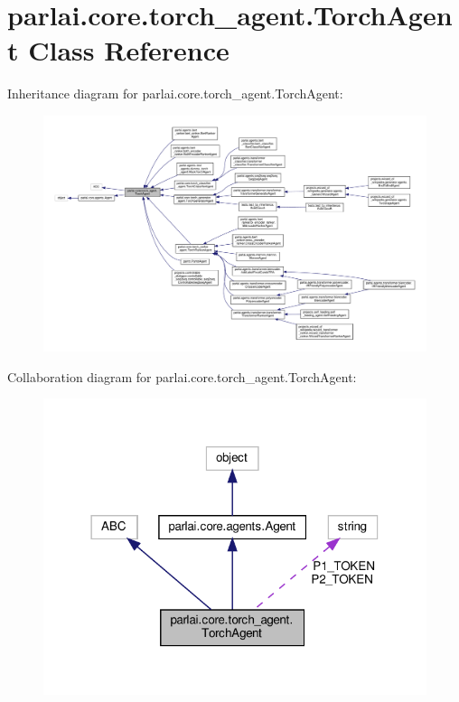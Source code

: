 \hypertarget{classparlai_1_1core_1_1torch__agent_1_1TorchAgent}{}\section{parlai.\+core.\+torch\+\_\+agent.\+Torch\+Agent Class Reference}
\label{classparlai_1_1core_1_1torch__agent_1_1TorchAgent}


Inheritance diagram for parlai.\+core.\+torch\+\_\+agent.\+Torch\+Agent\+:
\nopagebreak
\begin{figure}[H]
\begin{center}
\leavevmode
\includegraphics[width=350pt]{classparlai_1_1core_1_1torch__agent_1_1TorchAgent__inherit__graph}
\end{center}
\end{figure}


Collaboration diagram for parlai.\+core.\+torch\+\_\+agent.\+Torch\+Agent\+:
\nopagebreak
\begin{figure}[H]
\begin{center}
\leavevmode
\includegraphics[width=318pt]{classparlai_1_1core_1_1torch__agent_1_1TorchAgent__coll__graph}
\end{center}
\end{figure}
